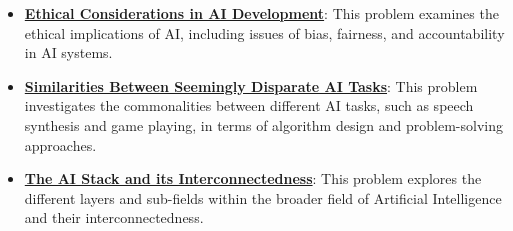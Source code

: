 \documentclass{article}%
\begin{document}
\begin{itemize}[leftmargin=*]
\item \href{https://purdue.brightspace.com/d2l/common/assets/pdfjs-d2l-dist/1.0.14-legacy/web/viewer.html?file=\%2Fcontent\%2Fenforced\%2F1095467-wl.202510.CS.24300.001\%2F02L2-Intro.pdf\%3Fou\%3D1095467\&lang=en-us\&container=d2l-fileviewer-rendered-pdf\&fullscreen=d2l-fileviewer-rendered-pdf-dialog\&height=667#page=20}{\textbf{Ethical Considerations in AI Development}}: This problem examines the ethical implications of AI, including issues of bias, fairness, and accountability in AI systems.%
\item \href{https://purdue.brightspace.com/d2l/common/assets/pdfjs-d2l-dist/1.0.14-legacy/web/viewer.html?file=\%2Fcontent\%2Fenforced\%2F1095467-wl.202510.CS.24300.001\%2F02L2-Intro.pdf\%3Fou\%3D1095467\&lang=en-us\&container=d2l-fileviewer-rendered-pdf\&fullscreen=d2l-fileviewer-rendered-pdf-dialog\&height=667#page=31}{\textbf{Similarities Between Seemingly Disparate AI Tasks}}: This problem investigates the commonalities between different AI tasks, such as speech synthesis and game playing, in terms of algorithm design and problem{-}solving approaches.%
\item \href{https://purdue.brightspace.com/d2l/common/assets/pdfjs-d2l-dist/1.0.14-legacy/web/viewer.html?file=\%2Fcontent\%2Fenforced\%2F1095467-wl.202510.CS.24300.001\%2F02L2-Intro.pdf\%3Fou\%3D1095467\&lang=en-us\&container=d2l-fileviewer-rendered-pdf\&fullscreen=d2l-fileviewer-rendered-pdf-dialog\&height=667#page=44}{\textbf{The AI Stack and its Interconnectedness}}: This problem explores the different layers and sub{-}fields within the broader field of Artificial Intelligence and their interconnectedness.%
\end{itemize}

%
\end{document}
